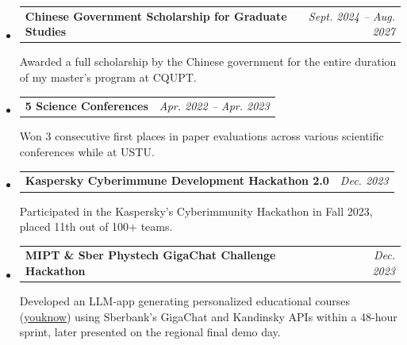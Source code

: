 \documentclass[11pt,letterpaper]{article}
\makeatletter
\newcommand{\headerrow}[2]
{\begin{tabular*}{\linewidth}{l@{\extracolsep{\fill}}r}
#1 & #2 \\
\end{tabular*}}
\makeatother
\begin{document}
\begin{itemize}[leftmargin=0em, itemsep=0.4em]
    \parskip=0.1em
    \renewcommand\labelitemi{}

    \item 
    \headerrow
        {\textbf{Chinese Government Scholarship for Graduate Studies}}
        {\emph{Sept. 2024 -- Aug. 2027}}
    Awarded a full scholarship by the Chinese government for the entire duration of my master's program at CQUPT.

    \item
    \headerrow
        {\textbf{5 Science Conferences}}
        {\emph{Apr. 2022 -- Apr. 2023}}
    Won 3 consecutive first places in paper evaluations across various scientific conferences while at USTU.

    \item
    \headerrow
        {\textbf{Kaspersky Cyberimmune Development Hackathon 2.0}}
        {\emph{Dec. 2023}}
    Participated in the Kaspersky’s Cyberimmunity Hackathon in Fall 2023, placed 11th out of 100+ teams.

    \item
    \headerrow
        {\textbf{MIPT \& Sber Phystech GigaChat Challenge Hackathon}}
        {\emph{Dec. 2023}}
    Developed an LLM-app generating personalized educational courses (\href{https://youknow.academai.ru}{youknow})
    using Sberbank's GigaChat and Kandinsky APIs within a 48-hour sprint, later presented on the regional final demo day.

\end{itemize}
\end{document}
